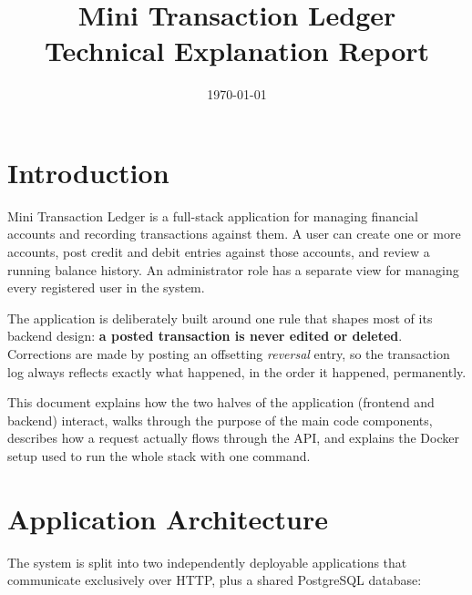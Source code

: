 \documentclass[11pt]{article}
\title{\textbf{Mini Transaction Ledger} \\ \large Technical Explanation Report}
\author{}
\date{\today}
\begin{document}
\maketitle

\tableofcontents
\newpage

\section{Introduction}

Mini Transaction Ledger is a full-stack application for managing financial
accounts and recording transactions against them. A user can create one or
more accounts, post credit and debit entries against those accounts, and
review a running balance history. An administrator role has a separate
view for managing every registered user in the system.

The application is deliberately built around one rule that shapes most of
its backend design: \textbf{a posted transaction is never edited or
deleted}. Corrections are made by posting an offsetting \emph{reversal}
entry, so the transaction log always reflects exactly what happened, in
the order it happened, permanently.

This document explains how the two halves of the application (frontend
and backend) interact, walks through the purpose of the main code
components, describes how a request actually flows through the API, and
explains the Docker setup used to run the whole stack with one command.

\section{Application Architecture}

The system is split into two independently deployable applications that
communicate exclusively over HTTP, plus a shared PostgreSQL database:
\end{document}
